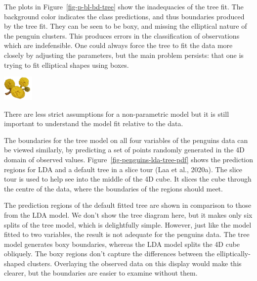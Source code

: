 \documentclass[
  letterpaper,
]{krantz}
\newcommand{\infobox}[1]{%
\noindent\colorbox{info!30}{%
\begin{minipage}{0.98\linewidth}%
    \centering%
    \begin{minipage}[c]{0.15\linewidth} %
      \includegraphics[width=1.5cm]{images/mulga-flowers2.png} %
    \end{minipage}%
    \hfill %
    \begin{minipage}[c]{0.8\linewidth} %
      \bigskip%
      \textsf{#1}%
      \bigskip%
    \end{minipage}%
    \hspace*{3mm}%
  \end{minipage}%
}%
}
\begin{document}
The plots in Figure~\ref{fig-p-bl-bd-tree} show the inadequacies of the
tree fit. The background color indicates the class predictions, and thus
boundaries produced by the tree fit. They can be seen to be boxy, and
missing the elliptical nature of the penguin clusters. This produces
errors in the classification of observations which are indefensible. One
could always force the tree to fit the data more closely by adjusting
the parameters, but the main problem persists: that one is trying to fit
elliptical shapes using boxes.

\infobox{There are less strict assumptions for a non-parametric model but it is still important to understand the model fit relative to the data. 
}

The boundaries for the tree model on all four variables of the penguins
data can be viewed similarly, by predicting a set of points randomly
generated in the 4D domain of observed values.
Figure~\ref{fig-penguins-lda-tree-pdf} shows the prediction regions for
LDA and a default tree in a slice tour (Laa et al., 2020a). The slice
tour is used to help see into the middle of the 4D cube. It slices the
cube through the centre of the data, where the boundaries of the regions
should meet.

The prediction regions of the default fitted tree are shown in
comparison to those from the LDA model. We don't show the tree diagram
here, but it makes only six splits of the tree model, which is
delightfully simple. However, just like the model fitted to two
variables, the result is not adequate for the penguins data. The tree
model generates boxy boundaries, whereas the LDA model splits the 4D
cube obliquely. The boxy regions don't capture the differences between
the elliptically-shaped clusters. Overlaying the observed data on this
display would make this clearer, but the boundaries are easier to
examine without them.

\end{document}
